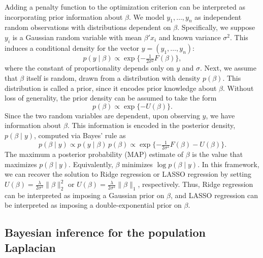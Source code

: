 \documentclass[12pt]{article}
\theoremstyle{plain}
\begin{document}
Adding a penalty function to the optimization criterion can be
interpreted as incorporating prior information about $\beta$.  We
model $y_1, \dotsc, y_n$ as independent random observations with
distributions dependent on $\beta$.  Specifically, we suppose $y_i$ is
a Gaussian random variable with mean $\beta' x_i$ and known variance
$\sigma^2$.  This induces a conditional density for the vector
$y = (y_1, \dotsc, y_n)$:
\begin{equation}\label{E:regression-density}
  p(y \mid \beta)
    \propto
     \exp\{ -\tfrac{1}{2 \sigma^2} F(\beta) \},
\end{equation}
where the constant of proportionality depends only on $y$ and $\sigma$.
Next, we assume that $\beta$ itself is random, drawn from a
distribution with density $p(\beta)$.  This distribution is called a
prior, since it encodes prior knowledge about $\beta$.  Without loss
of generality, the prior density can be assumed to take the form
\begin{equation}\label{E:regression-prior}
  p(\beta) \propto \exp\{ -U(\beta) \}.
\end{equation}
Since the two random variables are dependent, upon observing $y$, we
have information about $\beta$.  This information is encoded in the
posterior density, $p(\beta \mid y)$, computed via Bayes' rule as
\begin{equation}\label{E:regression-posterior}
  p(\beta \mid y)
    \propto p(y \mid \beta) \, p(\beta)
    \propto \exp\{ -\tfrac{1}{2 \sigma^2} F(\beta) - U(\beta) \}.
\end{equation}
The maximum a posterior probability (MAP) estimate of $\beta$ is the value 
that maximizes $p(\beta \mid y)$.  
Equivalently, $\beta$ minimizes $\log p(\beta \mid y)$.  
In this framework, we can recover the solution to Ridge regression or LASSO 
regression by setting
$U(\beta) = \tfrac{\lambda}{2 \sigma^2} \| \beta \|_2^2$ or
$U(\beta) = \tfrac{\lambda}{2 \sigma^2} \| \beta \|_1$, respectively.  
Thus, Ridge regression can be interpreted as imposing a Gaussian prior on 
$\beta$, and LASSO regression can be interpreted as imposing a 
double-exponential prior on $\beta$.


\subsection{Bayesian inference for the population Laplacian}
\label{S:bayesian-laplacian}
\end{document}
